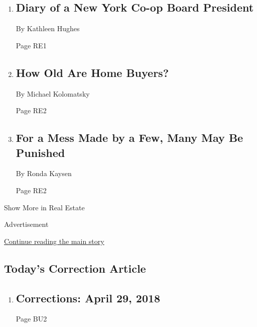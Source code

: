 \begin{enumerate}
\def\labelenumi{\arabic{enumi}.}
\item
  \href{/2018/04/27/realestate/diary-of-a-new-york-co-op-board-president.html}{}

  \hypertarget{diary-of-a-new-york-co-op-board-president}{%
  \subsection{Diary of a New York Co-op Board
  President}\label{diary-of-a-new-york-co-op-board-president}}

  By Kathleen Hughes

  Page RE1
\item
  \href{/2018/04/26/realestate/how-old-are-home-buyers.html}{}

  \hypertarget{how-old-are-home-buyers}{%
  \subsection{How Old Are Home Buyers?}\label{how-old-are-home-buyers}}

  By Michael Kolomatsky

  Page RE2
\item
  \href{/2018/04/28/realestate/when-the-trash-room-is-messy-the-whole-floor-is-threatened-with-a-fine.html}{}

  \hypertarget{for-a-mess-made-by-a-few-many-may-be-punished}{%
  \subsection{For a Mess Made by a Few, Many May Be
  Punished}\label{for-a-mess-made-by-a-few-many-may-be-punished}}

  By Ronda Kaysen

  Page RE2
\end{enumerate}

Show More in Real Estate

Advertisement

\protect\hyperlink{after-mid8}{Continue reading the main story}

\hypertarget{todays-correction-article}{%
\subsection{Today's Correction
Article}\label{todays-correction-article}}

\begin{enumerate}
\def\labelenumi{\arabic{enumi}.}
\item
  \href{/2018/04/28/pageoneplus/corrections-april-29-2018.html}{}

  \hypertarget{corrections-april-29-2018}{%
  \subsection{Corrections: April 29,
  2018}\label{corrections-april-29-2018}}

  Page BU2
\end{enumerate}


